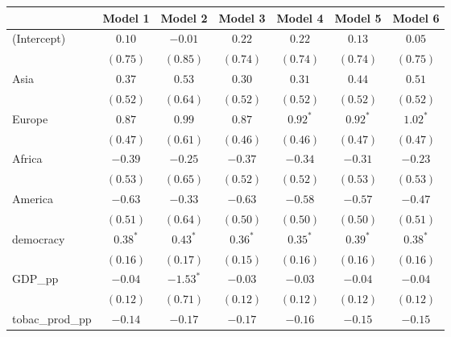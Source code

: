 
\begin{table}[!h]
\begin{center}
\begin{tabular}{l c c c c c c }
\toprule
 & Model 1 & Model 2 & Model 3 & Model 4 & Model 5 & Model 6 \\
\midrule
(Intercept)             & $0.10$       & $-0.01$      & $0.22$       & $0.22$       & $0.13$       & $0.05$       \\
                        & $(0.75)$     & $(0.85)$     & $(0.74)$     & $(0.74)$     & $(0.74)$     & $(0.75)$     \\
Asia                    & $0.37$       & $0.53$       & $0.30$       & $0.31$       & $0.44$       & $0.51$       \\
                        & $(0.52)$     & $(0.64)$     & $(0.52)$     & $(0.52)$     & $(0.52)$     & $(0.52)$     \\
Europe                  & $0.87$       & $0.99$       & $0.87$       & $0.92^{*}$   & $0.92^{*}$   & $1.02^{*}$   \\
                        & $(0.47)$     & $(0.61)$     & $(0.46)$     & $(0.46)$     & $(0.47)$     & $(0.47)$     \\
Africa                  & $-0.39$      & $-0.25$      & $-0.37$      & $-0.34$      & $-0.31$      & $-0.23$      \\
                        & $(0.53)$     & $(0.65)$     & $(0.52)$     & $(0.52)$     & $(0.53)$     & $(0.53)$     \\
America                 & $-0.63$      & $-0.33$      & $-0.63$      & $-0.58$      & $-0.57$      & $-0.47$      \\
                        & $(0.51)$     & $(0.64)$     & $(0.50)$     & $(0.50)$     & $(0.50)$     & $(0.51)$     \\
democracy               & $0.38^{*}$   & $0.43^{*}$   & $0.36^{*}$   & $0.35^{*}$   & $0.39^{*}$   & $0.38^{*}$   \\
                        & $(0.16)$     & $(0.17)$     & $(0.15)$     & $(0.16)$     & $(0.16)$     & $(0.16)$     \\
GDP\_pp                 & $-0.04$      & $-1.53^{*}$  & $-0.03$      & $-0.03$      & $-0.04$      & $-0.04$      \\
                        & $(0.12)$     & $(0.71)$     & $(0.12)$     & $(0.12)$     & $(0.12)$     & $(0.12)$     \\
tobac\_prod\_pp         & $-0.14$      & $-0.17$      & $-0.17$      & $-0.16$      & $-0.15$      & $-0.15$      \\

\end{tabular}
\end{center}
\end{table}
